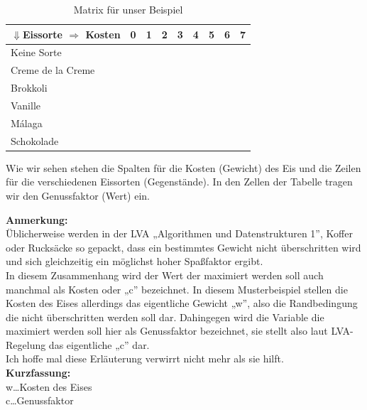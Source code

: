 \documentclass[a4paper, 12pt]{article}
\begin{document}
\begin{table}[H]
	\begin{center}
		\begin{tabular}{l|cccccccc}
			$⇓$Eissorte $⇒$ Kosten & 0 & 1 & 2 & 3 & 4 & 5 &
			6 & 7\\
			\hline
			Keine Sorte			&	&	&	&	&	&	&	&\\
			Creme de la Creme	&	&	&	&	&	&	&	&\\
			Brokkoli			&	&	&	&	&	&	&	&\\
			Vanille				&	&	&	&	&	&	&	&\\
			Málaga				&	&	&	&	&	&	&	&\\
			Schokolade			&	&	&	&	&	&	&	&\\
		\end{tabular}
	\end{center}
\caption{Matrix für unser Beispiel}
\label{table:Leer}
\end{table}

Wie wir sehen stehen die Spalten für die Kosten (Gewicht) des Eis und die
Zeilen für die verschiedenen Eissorten (Gegenstände). In den Zellen der
Tabelle tragen wir den Genussfaktor (Wert) ein.

\begin{leftbar}
	\textbf{Anmerkung:}\\

	Üblicherweise werden in der LVA „Algorithmen und Datenstrukturen 1”,
    Koffer oder Rucksäcke so gepackt, dass ein bestimmtes Gewicht nicht
    überschritten wird und sich gleichzeitig ein möglichst hoher Spaßfaktor
    ergibt.\\

	In diesem Zusammenhang wird der Wert der maximiert werden soll auch
    manchmal als Kosten oder „c” bezeichnet. In diesem Musterbeispiel stellen
    die Kosten des Eises allerdings das eigentliche Gewicht „w”, also die
    Randbedingung die nicht überschritten werden soll dar. Dahingegen wird die
    Variable die maximiert werden soll hier als Genussfaktor bezeichnet, sie
    stellt also laut LVA-Regelung das eigentliche „c” dar.\\

	Ich hoffe mal diese Erläuterung verwirrt nicht mehr als sie hilft.\\

	\textbf{Kurzfassung:}\\
	w\dots Kosten des Eises\\
	c\dots Genussfaktor
\end{leftbar}
\end{document}
